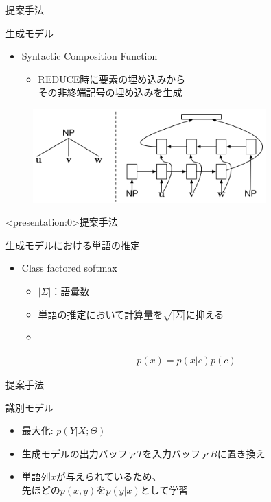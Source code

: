 \documentclass[aspectratio=43,unicode,10pt]{beamer}
\newcommand{\nt}{非終端記号}
\begin{document}
\begin{frame}{提案手法}
  \begin{block}{生成モデル}
    \begin{itemize}
      \item Syntactic Composition Function
        \begin{itemize}
          \item REDUCE時に要素の埋め込みから\\その\nt の埋め込みを生成
        \end{itemize}
    \end{itemize}
    \begin{figure}
      \includegraphics[width=0.8\textwidth]{fig/fig_6.png}
    \end{figure}
  \end{block}
\end{frame}

\begin{frame}<presentation:0>{提案手法}
  \begin{block}{生成モデルにおける単語の推定}
    \begin{itemize}
      \item Class factored softmax
        \begin{itemize}
          \item $|\Sigma|$：語彙数
          \item 単語の推定において計算量を$\sqrt{|\Sigma|}$に抑える
          \item
        \end{itemize}
        \begin{gather*}
          p(x) = p(x|c)p(c)
        \end{gather*}
    \end{itemize}
  \end{block}
\end{frame}

\begin{frame}{提案手法}
  \begin{block}{識別モデル}
    \begin{itemize}
      \item 最大化: $p(Y | X; \Theta)$
      \item 生成モデルの出力バッファ$T$を入力バッファ$B$に置き換え
      \item 単語列$x$が与えられているため、 \\
            先ほどの$p(x, y)$を$p(y|x)$として学習
    \end{itemize}
  \end{block}
\end{frame}
\end{document}
